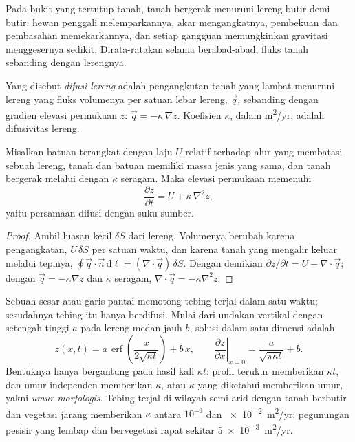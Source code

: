 Pada bukit yang tertutup tanah, tanah bergerak menuruni lereng butir demi butir: hewan penggali
melemparkannya, akar mengangkatnya, pembekuan dan pembasahan memekarkannya, dan setiap
gangguan memungkinkan gravitasi menggesernya sedikit. Dirata-ratakan selama berabad-abad, fluks
tanah sebanding dengan lerengnya.

\begin{definition}\label{def:b3:quantitative-geomorphology:diffusion}
Yang disebut \emph{difusi lereng} adalah pengangkutan tanah yang lambat
menuruni lereng yang fluks volumenya per satuan lebar lereng,
$\vec q$, sebanding dengan gradien elevasi permukaan $z$:
$\vec q = -\kappa\,\nabla z$. Koefisien $\kappa$, dalam
\unit{m^2/yr}, adalah difusivitas lereng.
\end{definition}

\begin{theorem}\label{thm:b3:quantitative-geomorphology:diffusion}
Misalkan batuan terangkat dengan laju $U$ relatif terhadap alur yang membatasi
sebuah lereng, tanah dan batuan memiliki massa jenis yang sama, dan tanah bergerak melalui
 dengan $\kappa$ seragam. Maka elevasi permukaan memenuhi
\[
\frac{\partial z}{\partial t} = U + \kappa\,\nabla^2 z ,
\]
yaitu persamaan difusi dengan suku sumber.
\end{theorem}

\begin{proof}
Ambil luasan kecil $\delta S$ dari lereng. Volumenya berubah karena pengangkatan,
$U\,\delta S$ per satuan waktu, dan karena tanah yang mengalir keluar melalui
tepinya, $\oint \vec q\cdot\vec n\,\mathrm{d}\ell = (\nabla\cdot\vec q)\,\delta S$.
Dengan demikian $\partial z/\partial t = U - \nabla\cdot\vec q$; dengan $\vec q = -\kappa
\nabla z$ dan $\kappa$ seragam, $\nabla\cdot\vec q = -\kappa\nabla^2 z$.
\end{proof}

Sebuah sesar atau garis pantai memotong tebing terjal dalam satu waktu; sesudahnya tebing itu hanya
berdifusi. Mulai dari undakan vertikal dengan setengah tinggi $a$ pada lereng medan jauh
$b$, solusi dalam satu dimensi adalah
\[
z(x,t) = a\,\operatorname{erf}\!\left(\frac{x}{2\sqrt{\kappa t}}\right) + b\,x ,
\qquad
\left.\frac{\partial z}{\partial x}\right|_{x=0} = \frac{a}{\sqrt{\pi\kappa t}} + b .
\]
Bentuknya hanya bergantung pada hasil kali $\kappa t$: profil terukur memberikan
$\kappa t$, dan umur independen memberikan $\kappa$, atau $\kappa$ yang diketahui
memberikan umur, yakni \emph{umur morfologis}. Tebing terjal di wilayah semi-arid
dengan tanah berbutir dan vegetasi jarang memberikan $\kappa$ antara
$10^{-3}$ dan \qty{e-2}{m^2/yr}; pegunungan pesisir yang lembap dan bervegetasi rapat
sekitar \qty{5e-3}{m^2/yr}.

